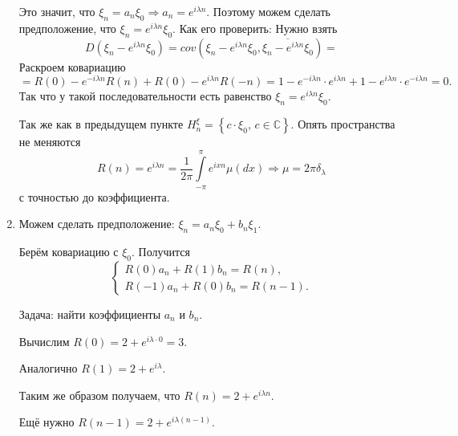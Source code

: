 \begin{enumerate}[label=\alph*)]
  Это значит, что $ \xi_n = a_n \xi_0 \Rightarrow a_n = e^{i \lambda n}$.
  Поэтому можем сделать предположение, что $ \xi_n = e^{i \lambda n} \xi_0$.
  Как его проверить:
  Нужно взять
  \begin{equation*}
    D \left( \xi_n - e^{i \lambda n} \xi_0 \right) =
    cov \left( \xi_n - e^{i \lambda n} \xi_0, \overline{ \xi_n - e^{i \lambda n} \xi_0} \right) =
  \end{equation*}
  Раскроем ковариацию
  \begin{equation*}
    = R \left( 0 \right) - e^{-i \lambda n} R \left( n \right) + R \left( 0 \right) -
    e^{i \lambda n} R \left( -n \right) =
    1 - e^{-i \lambda n} \cdot e^{i \lambda n} + 1 - e^{i \lambda n} \cdot e^{-i \lambda n} =
    0.
  \end{equation*}
  Так что у такой последовательности есть равенство $ \xi_n = e^{i \lambda n} \xi_0$.

  Так же как в предыдущем пункте
  $H_n^{ \xi } = \left\{ c \cdot \xi_0, \, c \in \mathbb{C} \right\} $.
  Опять пространства не меняются
  \begin{equation*}
    R \left( n \right) =
    e^{i \lambda n} =
    \frac{1}{2 \pi } \int \limits_{-\pi }^{ \pi } e^{ixn} \mu \left( dx \right) \Rightarrow
    \mu = 2 \pi \delta_{ \lambda }
  \end{equation*}
  с точностью до коэффициента.
  \item Можем сделать предположение: $ \xi_n = a_n \xi_0 + b_n \xi_1$.

  Берём ковариацию с $ \xi_0$.
  Получится
  \begin{equation*}
    \begin{cases}
      R \left( 0 \right) a_n + R \left( 1 \right) b_n = R \left( n \right), \\
      R \left( -1 \right) a_n + R \left( 0 \right) b_n = R \left( n - 1 \right).
    \end{cases}
  \end{equation*}

  Задача: найти коэффициенты $a_n$ и $b_n$.

  Вычислим $R \left( 0 \right) = 2 + e^{i \lambda \cdot 0} = 3$.

  Аналогично $R \left( 1 \right) = 2 + e^{i \lambda }$.

  Таким же образом получаем, что $R \left( n \right) = 2 + e^{i \lambda n}$.

  Ещё нужно $R \left( n - 1 \right) = 2 + e^{i \lambda \left( n - 1 \right) }$.


\end{enumerate}
